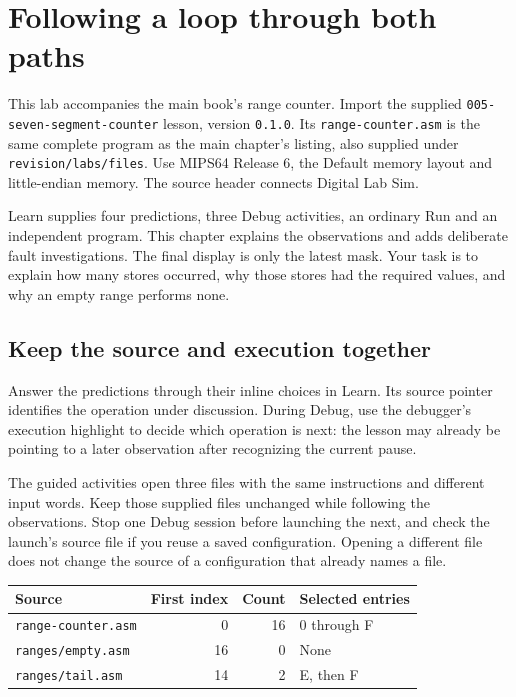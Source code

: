 \chapter{Following a loop through both paths}
\label{revision:lab-decisions-and-repetition}

This lab accompanies the main book's range counter. Import the supplied
\texttt{005-seven-segment-counter} lesson, version \texttt{0.1.0}. Its
\texttt{range-counter.asm} is the same complete program as the main chapter's
listing, also supplied under \texttt{revision/labs/files}. Use MIPS64 Release 6,
the Default memory layout and little-endian memory. The source header connects
Digital Lab Sim.

Learn supplies four predictions, three Debug activities, an ordinary Run and an
independent program. This chapter explains the observations and adds deliberate
fault investigations. The final display is only the latest mask. Your task is
to explain how many stores occurred, why those stores had the required values,
and why an empty range performs none.

\section{Keep the source and execution together}

Answer the predictions through their inline choices in Learn. Its source pointer
identifies the operation under discussion. During Debug, use the debugger's
execution highlight to decide which operation is next: the lesson may already
be pointing to a later observation after recognizing the current pause.

The guided activities open three files with the same instructions and different
input words. Keep those supplied files unchanged while following the observations.
Stop one Debug session before launching the next, and check the launch's source
file if you reuse a saved configuration. Opening a different file does not change
the source of a configuration that already names a file.

\begin{center}
  \begin{tabular}{@{}lrrl@{}}
    \toprule
    Source                     & First index & Count & Selected entries \\
    \midrule
    \texttt{range-counter.asm} & 0           & 16    & 0 through F      \\
    \texttt{ranges/empty.asm}  & 16          & 0     & None             \\
    \texttt{ranges/tail.asm}   & 14          & 2     & E, then F        \\
    \bottomrule
  \end{tabular}
\end{center}


